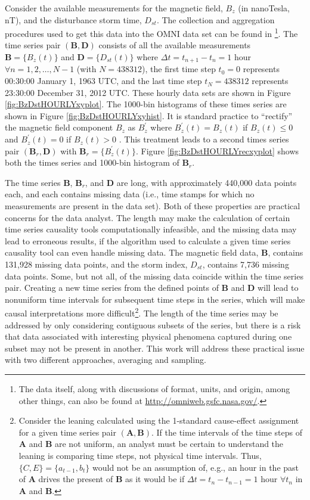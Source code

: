 Consider the available measurements for the magnetic field, $B_z$ (in nanoTesla, nT), and the disturbance storm time, $D_{st}$.  The collection and aggregation procedures used to get this data into the OMNI data set can be found in \cite{King2005}\footnote{The data itself, along with discussions of format, units, and origin, among other things, can also be found at \url{http://omniweb.gsfc.nasa.gov/}.}.  The time series pair $(\mathbf{B},\mathbf{D})$ consists of all the available measurements $\mathbf{B} =\{B_z(t)\}$ and $\mathbf{D}=\{D_{st}(t)\}$ where $\Delta t=t_{n+1}-t_n=1$ hour $\forall n=1,2,\ldots,N-1$ (with $N=438312$), the first time step $t_0=0$ represents 00:30:00 January 1, 1963 UTC, and the last time step $t_N = 438312$ represents 23:30:00 December 31, 2012 UTC.  These hourly data sets are shown in Figure \ref{fig:BzDstHOURLYxyplot}.  The 1000-bin histograms of these times series are shown in Figure \ref{fig:BzDstHOURLYxyhist}.  It is standard practice to ``rectify'' the magnetic field component $B_z$ as $B_z^\prime$ where $B_z^\prime(t) = B_z(t)$ if $B_z(t)\le 0$ and $B_z^\prime(t) = 0$ if $B_z(t)>0$ \cite{Burton1975,Dungey1961}.  This treatment leads to a second times series pair $(\mathbf{B}_r,\mathbf{D})$ with $\mathbf{B}_r = \{B_z^\prime (t)\}$.  Figure \ref{fig:BzDstHOURLYrecxyplot} shows both the times series and 1000-bin histogram of $\mathbf{B}_r$.

The time series $\mathbf{B}$, $\mathbf{B}_r$, and $\mathbf{D}$ are long, with approximately 440,000 data points each, and each contains missing data (i.e., time stamps for which no measurements are present in the data set).  Both of these properties are practical concerns for the data analyst.  The length may make the calculation of certain time series causality tools computationally infeasible, and the missing data may lead to erroneous results, if the algorithm used to calculate a given time series causality tool can even handle missing data.  The magnetic field data, $\mathbf{B}$, contains 131,928 missing data points, and the storm index, $D_{st}$, contains 7,736 missing data points.  Some, but not all, of the missing data coincide within the time series pair.  Creating a new time series from the defined points of $\mathbf{B}$ and $\mathbf{D}$ will lead to nonuniform time intervals for subsequent time steps in the series, which will make causal interpretations more difficult\footnote{Consider the leaning calculated using the 1-standard cause-effect assignment for a given time series pair $(\mathbf{A},\mathbf{B})$.  If the time intervals of the time steps of $\mathbf{A}$ and $\mathbf{B}$ are not uniform, an analyst must be certain to understand the leaning is comparing time steps, not physical time intervals.  Thus, $\{C,E\}=\{a_{t-1},b_t\}$ would not be an assumption of, e.g., an hour in the past of $\mathbf{A}$ drives the present of $\mathbf{B}$ as it would be if $\Delta t = t_{n} - t_{n-1} = 1$ hour $\forall t_n$ in $\mathbf{A}$ and $\mathbf{B}$.}.  The length of the time series may be addressed by only considering contiguous subsets of the series, but there is a risk that data associated with interesting physical phenomena captured during one subset may not be present in another.  This work will address these practical issue with two different approaches, averaging and sampling.


